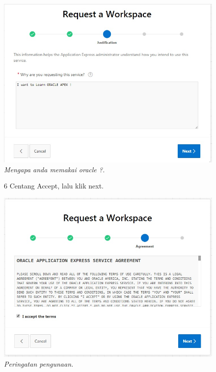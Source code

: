 \begin{enumerate}
\begin{figure}
    \begin{center}
\includegraphics[scale=0.5]{figures/req3.jpg}
    \caption{\textit{Mengapa anda memakai oracle ?.}}
        \end{center}

\label{gambar}
\end{figure}

\begin{figure}
\item[6] Centang Accept, lalu klik next.

    \begin{center}
\includegraphics[scale=0.5]{figures/req4.jpg}
    \caption{\textit{Peringatan pengunaan.}}
        \end{center}


\end{figure}
\end{enumerate}
